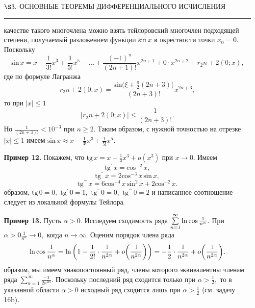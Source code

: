 \documentclass[a5paper, 16pt]{book}
\begin{document}
    \begin{flushleft}
        \begin{spacing}
            $\S3.$ \small{ОСНОВНЫЕ ТЕОРЕМЫ ДИФФЕРЕНЦИАЛЬНОГО ИСЧИСЛЕНИЯ}
            \noindent\rule{\textwidth}{1pt}
		\end{spacing}
    \end{flushleft}
     качестве такого многочлена можно взять тейлоровский многочлен подходящей степени, получаемый разложением функции sin\,$x$ в окрестности точки $x_0 = 0.$ Поскольку
    $$\textrm{sin} \, x = x - \frac{1}{3!} x^{3} + \frac{1}{5!} x^{5} - . . . + \frac{(-1)^{n}}{(2n + 1)!} x^{2n + 1} + 0 \cdot x^{2n + 2} + r_2n+2 (0 ; x) ,$$
    где по формуле Лагранжа
    $$r_2n+2 (0 ; x) = \frac{\textrm{sin} \bigg(\xi + \frac{\pi}{2} (2n + 3) \bigg)}{(2n + 3)!} x^{2n + 3},$$
    то при $|x| \leq 1$
    $$|r_2n + 2 (0 ; x)| \leq \frac{1}{(2n + 3)!}.$$
    Но $\frac{1}{(2n + 3)!} < 10^{-3}$ при $n \geq 2.$ Таким образом, с нужной точностью на отрезке $|x| \leq 1$ имеем $\textrm{sin} \, x \approx x - \frac{1}{3!} x^{3} + \frac{1}{5!} x^{5}.$
    \par\textbf{Пример 12.} Покажем, что $\textrm{tg} \, x = x + \frac{1}{3} x^{3} + o(x^{3})$ при $x \to 0.$ Имеем 
    $$\textrm{tg} ^{'} \, x = \textrm{cos} ^{-2} \, x ,$$
    $$\textrm{tg} ^{''} \, x = 2\textrm{cos} ^{-3} \, x \, \textrm{sin} \, x ,$$
    $$\textrm{tg} ^{'''} \, x = 6\textrm{cos} ^{-4} \, x \, \textrm{sin} ^{2} \, x + 2\textrm{cos} ^{-2} \, x .$$
     образом, $\textrm{tg} \, 0 = 0,$ $\textrm{tg} ^{'} \, 0 = 1,$ $\textrm{tg} ^{''} \, 0 = 0,$ $\textrm{tg} ^{'''} \, 0 = 2$ и написанное соотношение следует из локальной формулы Тейлора.
    \par\textbf{Пример 13.} Пусть $\alpha > 0.$ Исследуем сходимость ряда $\sum\limits_{n = 1}^\infty \textrm{ln\,cos\,} \frac{1}{n^{\alpha}} .$ При $\alpha > 0 \frac{1}{n^{\alpha}} \to 0,$ когда $n \to \infty$. Оценим порядок члена ряда
    $$\textrm{ln\,cos\,} \frac{1}{n^{\alpha}} = \textrm{ln\,} \bigg(1 - \frac{1}{2!} \cdot \frac{1}{n^{2\alpha}} + o\bigg(\frac{1}{n^{2\alpha}}\bigg)\bigg) = - \frac{1}{2} \cdot \frac{1}{n^{2\alpha}} + o\bigg(\frac{1}{n^{2\alpha}}\bigg) .$$
     образом, мы имеем знакопостоянный ряд, члены которого эквивалентны членам ряда $\sum\limits_{n = 1}^\infty \frac{-1}{2n^{2\alpha}} .$ Поскольку последний ряд сходится только при $\alpha > \frac{1}{2},$ то в указанной области $\alpha > 0$ исходный ряд сходится лишь при $\alpha > \frac{1}{2}$ (см. задачу 16b).
    
\end{document}
